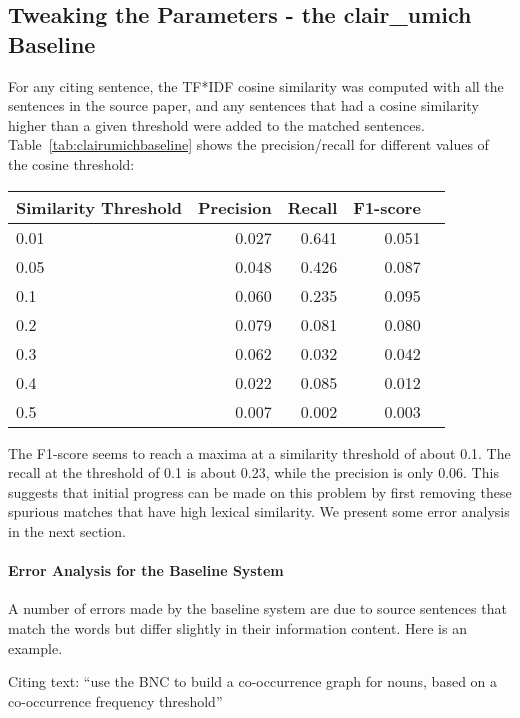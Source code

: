 \documentclass[11pt]{article}
\begin{document}
\subsection{Tweaking the Parameters - the clair\_umich Baseline}
For any citing sentence, the TF*IDF cosine similarity was computed with all the sentences in the source paper, and any sentences that had a cosine similarity higher than a given threshold were added to the matched sentences. Table~\ref{tab:clairumichbaseline} shows the precision/recall for different values of the cosine threshold:
\begin{table*}
  \centering
  \begin{tabular}{l|rrrr}
Similarity Threshold & Precision & Recall & F1-score\\
\hline
0.01 & 0.027 & 0.641 & 0.051\\
0.05 & 0.048 & 0.426 & 0.087\\
0.1 & 0.060 & 0.235 & 0.095\\
0.2 & 0.079 & 0.081 & 0.080\\
0.3 & 0.062 & 0.032 & 0.042\\
0.4 & 0.022 & 0.085 & 0.012\\
0.5 & 0.007 &  0.002 & 0.003\\
  \end{tabular}
  \caption{Precision/Recall for different values of the cosine threshold for the baseline clair\_umich system}
  \label{tab:clairumichbaseline}
\end{table*}

The F1-score seems to reach a maxima at a similarity threshold of about 0.1. The recall at the threshold of 0.1 is about 0.23, while the precision is only 0.06. This suggests that initial progress can be made on this problem by first removing these spurious matches that have high lexical similarity. We present some error analysis in the next section.

\paragraph{Error Analysis for the Baseline System}
A number of errors made by the baseline system are due to source sentences that match the words but differ slightly in their information content. Here is an example.

Citing text: ``use the BNC to build a co-occurrence graph for nouns, based on a co-occurrence frequency threshold''
\end{document}
